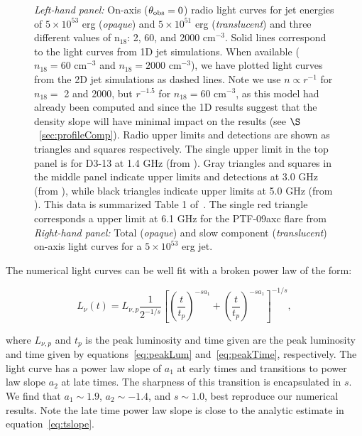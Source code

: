 \documentclass[usenatbib,fleqn]{mnras}
\begin{document}
\begin{figure}
  \caption{\label{fig:lightcurves} \textit{Left-hand panel:} On-axis
    ($\theta_{\rm obs}=0$) radio light curves for jet energies of
    $5\times 10^{53}$ erg ({\it opaque}) and $5\times 10^{51}$ erg
    ({\it translucent}) and three different values of n$_{18}$: 2, 60,
    and 2000 cm$^{-3}$.  Solid lines correspond to the light curves
    from 1D jet simulations. When available ($n_{18}=60$ cm$^{-3}$ and
    $n_{18}=2000$ cm$^{-3}$), we have plotted light curves from the 2D
    jet simulations as dashed lines. Note we use $n\propto r^{-1}$ for
    $n_{18}=$ 2 and 2000, but $r^{-1.5}$ for $n_{18}=60$ cm$^{-3}$, as
    this model had already been computed and since the 1D results
    suggest that the density slope will have minimal impact on the
    results (see $\S$~\ref{sec:profileComp}).  Radio upper limits and
    detections are shown as triangles and squares respectively. The
    single upper limit in the top panel is for D3-13 at 1.4 GHz (from
    \citet{Bower+2011}). Gray triangles and squares in the middle
    panel indicate upper limits and detections at 3.0 GHz (from
    \citealt{Bower+2013}), while black triangles indicate upper limits
    at 5.0 GHz (from \citealt{van-Velzen+2013}).  This data is
    summarized Table 1 of~\citealt{Mimica+2015}. The single red
    triangle corresponds a upper limit at 6.1 GHz for the PTF-09axc
    flare from \citet{Arcavi+2014} \textit{Right-hand panel:} Total
    ({\it opaque}) and slow component ({\it translucent}) on-axis
    light curves for a $5\times 10^{53}$ erg jet.}
\end{figure}

The numerical light curves can be well fit with a broken power law of
the form:

\begin{equation}
L_\nu (t) = L_{\nu, p} \frac{1}{2^{-1/s}}
\left[\left(\frac{t}{t_p}\right)^{-s
    a_1}+\left(\frac{t}{t_p}\right)^{-s a_1}\right]^{-1/s}, 
\label{eq:lcAnal}
\end{equation}

where $L_{\nu, p}$ and $t_p$ is the peak luminosity and time given are
the peak luminosity and time given by equations~\eqref{eq:peakLum}
and~\eqref{eq:peakTime}, respectively. The light curve has a power law
slope of $a_1$ at early times and transitions to power law slope $a_2$
at late times. The sharpness of this transition is encapsulated in
$s$. We find that $a_1\sim 1.9$, $a_2\sim -1.4$, and $s\sim 1.0$, best
reproduce our numerical results. Note the late time power law slope is
close to the analytic estimate in equation~\eqref{eq:tslope}.
\end{document}
